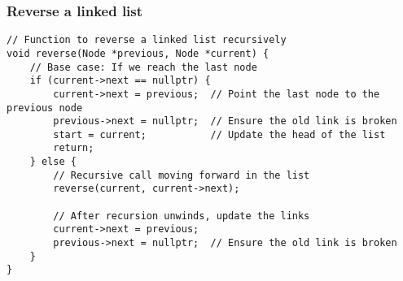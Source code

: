 \subsubsection{Reverse a linked list}
\begin{lstlisting}[style = codeexpert]
// Function to reverse a linked list recursively
void reverse(Node *previous, Node *current) {
    // Base case: If we reach the last node
    if (current->next == nullptr) {
        current->next = previous;  // Point the last node to the previous node
        previous->next = nullptr;  // Ensure the old link is broken
        start = current;           // Update the head of the list
        return;
    } else {
        // Recursive call moving forward in the list
        reverse(current, current->next);
        
        // After recursion unwinds, update the links
        current->next = previous;
        previous->next = nullptr;  // Ensure the old link is broken
    }
}

\end{lstlisting}